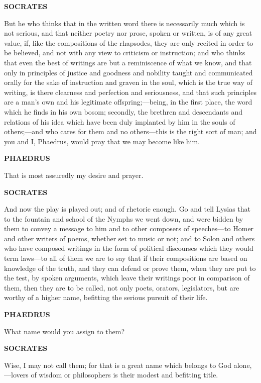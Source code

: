 \documentclass[11pt,letter]{article}
\begin{document}
\par \textbf{SOCRATES}
\par   But he who thinks that in the written word there is necessarily much which is not serious, and that neither poetry nor prose, spoken or written, is of any great value, if, like the compositions of the rhapsodes, they are only recited in order to be believed, and not with any view to criticism or instruction; and who thinks that even the best of writings are but a reminiscence of what we know, and that only in principles of justice and goodness and nobility taught and communicated orally for the sake of instruction and graven in the soul, which is the true way of writing, is there clearness and perfection and seriousness, and that such principles are a man's own and his legitimate offspring;—being, in the first place, the word which he finds in his own bosom; secondly, the brethren and descendants and relations of his idea which have been duly implanted by him in the souls of others;—and who cares for them and no others—this is the right sort of man; and you and I, Phaedrus, would pray that we may become like him.

\par \textbf{PHAEDRUS}
\par   That is most assuredly my desire and prayer.

\par \textbf{SOCRATES}
\par   And now the play is played out; and of rhetoric enough. Go and tell Lysias that to the fountain and school of the Nymphs we went down, and were bidden by them to convey a message to him and to other composers of speeches—to Homer and other writers of poems, whether set to music or not; and to Solon and others who have composed writings in the form of political discourses which they would term laws—to all of them we are to say that if their compositions are based on knowledge of the truth, and they can defend or prove them, when they are put to the test, by spoken arguments, which leave their writings poor in comparison of them, then they are to be called, not only poets, orators, legislators, but are worthy of a higher name, befitting the serious pursuit of their life.

\par \textbf{PHAEDRUS}
\par   What name would you assign to them?

\par \textbf{SOCRATES}
\par   Wise, I may not call them; for that is a great name which belongs to God alone,—lovers of wisdom or philosophers is their modest and befitting title.
\end{document}
